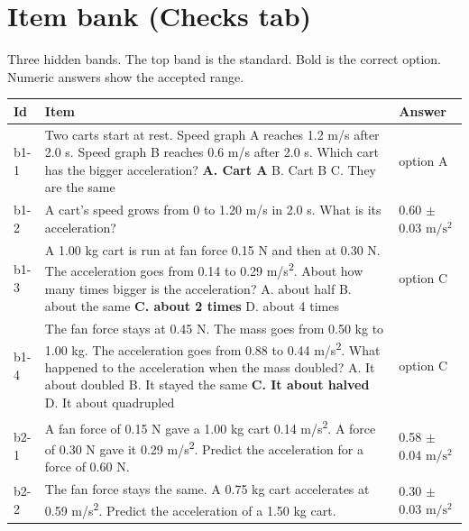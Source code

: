 \documentclass[10pt]{article}
\begin{document}
\section{Item bank (Checks tab)}
Three hidden bands. The top band is the standard. Bold is the correct option. Numeric answers show the accepted range.
\begin{longtable}{@{}p{0.4in} p{4.7in} p{1.2in}@{}}\toprule \textbf{Id} & \textbf{Item} & \textbf{Answer}\\\midrule\endhead
b1-1 & Two carts start at rest. Speed graph A reaches 1.2 m/s after 2.0 s. Speed graph B reaches 0.6 m/s after 2.0 s. Which cart has the bigger acceleration? \newline \textbf{A. Cart A} \newline B. Cart B \newline C. They are the same & option A \\
b1-2 & A cart's speed grows from 0 to 1.20 m/s in 2.0 s. What is its acceleration? & 0.60 $\pm$ 0.03 \ensuremath{\mathrm{m/s^2}} \\
b1-3 & A 1.00 kg cart is run at fan force 0.15 N and then at 0.30 N. The acceleration goes from 0.14 to 0.29 m/s\textsuperscript{2}. About how many times bigger is the acceleration? \newline A. about half \newline B. about the same \newline \textbf{C. about 2 times} \newline D. about 4 times & option C \\
b1-4 & The fan force stays at 0.45 N. The mass goes from 0.50 kg to 1.00 kg. The acceleration goes from 0.88 to 0.44 m/s\textsuperscript{2}. What happened to the acceleration when the mass doubled? \newline A. It about doubled \newline B. It stayed the same \newline \textbf{C. It about halved} \newline D. It about quadrupled & option C \\
b2-1 & A fan force of 0.15 N gave a 1.00 kg cart 0.14 m/s\textsuperscript{2}. A force of 0.30 N gave it 0.29 m/s\textsuperscript{2}. Predict the acceleration for a force of 0.60 N. & 0.58 $\pm$ 0.04 \ensuremath{\mathrm{m/s^2}} \\
b2-2 & The fan force stays the same. A 0.75 kg cart accelerates at 0.59 m/s\textsuperscript{2}. Predict the acceleration of a 1.50 kg cart. & 0.30 $\pm$ 0.03 \ensuremath{\mathrm{m/s^2}} \\

\end{longtable}
\end{document}
